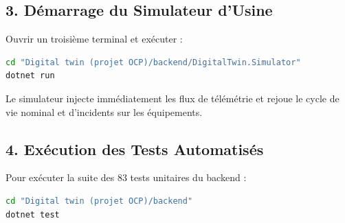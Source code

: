 \subsection{3. Démarrage du Simulateur d'Usine}
Ouvrir un troisième terminal et exécuter :
\begin{lstlisting}[language=bash]
cd "Digital twin (projet OCP)/backend/DigitalTwin.Simulator"
dotnet run
\end{lstlisting}
Le simulateur injecte immédiatement les flux de télémétrie et rejoue le cycle de vie nominal et d'incidents sur les équipements.

\subsection{4. Exécution des Tests Automatisés}
Pour exécuter la suite des 83 tests unitaires du backend :
\begin{lstlisting}[language=bash]
cd "Digital twin (projet OCP)/backend"
dotnet test
\end{lstlisting}
